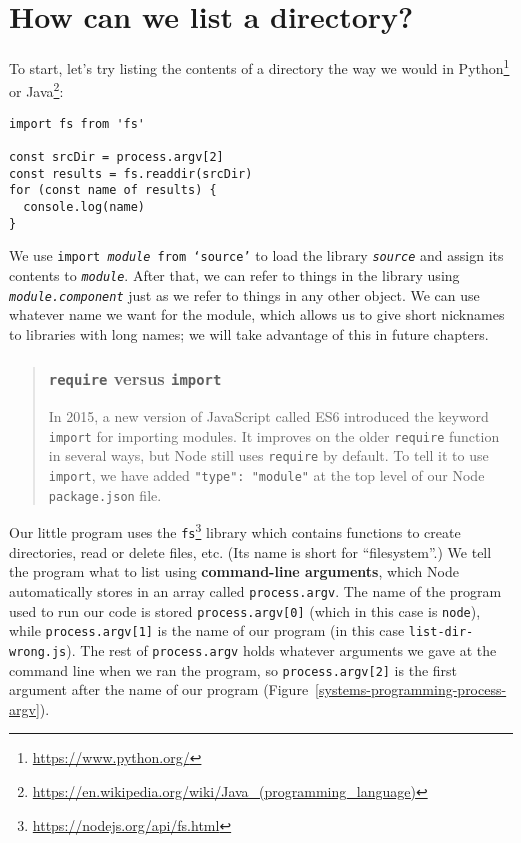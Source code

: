 \documentclass[krantzl]{krantz}
\newcommand{\figref}[1]{Figure~\ref{#1}}
\newcommand{\glossref}[1]{\textbf{#1}}
\newenvironment{callout}{\savenotes\begin{tBox}\begin{quotation}\toggletrue{inbox}\renewcommand{\thempfootnote}{\arabic{footnote}}}{\end{quotation}\vspace{\baselineskip}\end{tBox}\togglefalse{inbox}\spewnotes}
\newcommand{\hreffoot}[2]{{#1}\footnote{\href{#2}{#2}}}
\begin{document}
\newpage

\section{How can we list a directory?}\label{systems-programming-ls}


To start,
let’s try listing the contents of a directory the way we would in \hreffoot{Python}{https://www.python.org/}
or \hreffoot{Java}{https://en.wikipedia.org/wiki/Java\_(programming\_language)}:


\begin{lstlisting}[frame=tblr]
import fs from 'fs'

const srcDir = process.argv[2]
const results = fs.readdir(srcDir)
for (const name of results) {
  console.log(name)
}
\end{lstlisting}



\noindent We use \texttt{import \emph{module} from ‘source’} to load the library \texttt{\emph{source}}
and assign its contents to \texttt{\emph{module}}.
After that,
we can refer to things in the library using \texttt{\emph{module.component}}
just as we refer to things in any other object.
We can use whatever name we want for the module,
which allows us to give short nicknames to libraries with long names;
we will take advantage of this in future chapters.

\begin{callout}


\subsubsection*{\texttt{require} versus \texttt{import}}


In 2015, a new version of JavaScript called ES6 introduced
the keyword \texttt{import} for importing modules.
It improves on the older \texttt{require} function in several ways,
but Node still uses \texttt{require} by default.
To tell it to use \texttt{import},
we have added \texttt{"type": "module"} at the top level of our Node \texttt{package.json} file.

\end{callout}


Our little program uses the \hreffoot{\texttt{fs}}{https://nodejs.org/api/fs.html} library
which contains functions to create directories, read or delete files, etc.
(Its name is short for “filesystem”.)
We tell the program what to list using \glossref{command-line arguments},
which Node automatically stores in an array called \texttt{process.argv}.
The name of the program used to run our code is stored \texttt{process.argv[0]} (which in this case is \texttt{node}),
while \texttt{process.argv[1]} is the name of our program (in this case \texttt{list-dir-wrong.js}).
The rest of \texttt{process.argv} holds whatever arguments we gave at the command line when we ran the program,
so \texttt{process.argv[2]} is the first argument after the name of our program (\figref{systems-programming-process-argv}).
\end{document}

